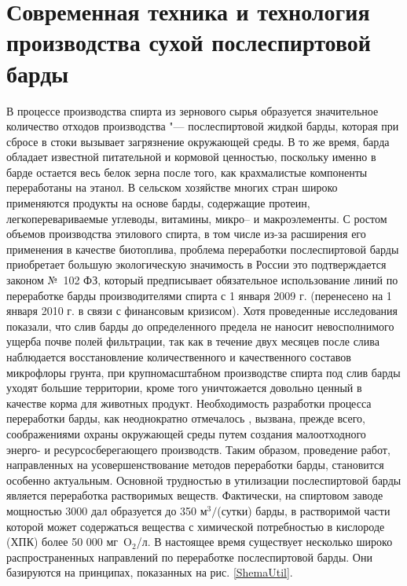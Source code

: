 \clearpage
\section{Современная техника и технология производства сухой послеспиртовой барды}

В процессе производства спирта из зернового сырья образуется значительное количество отходов производства "--- послеспиртовой жидкой барды, которая при сбросе в стоки вызывает загрязнение окружающей среды. 
В то же время, барда обладает известной питательной и кормовой ценностью, поскольку именно в барде остается весь белок зерна после того, как крахмалистые компоненты переработаны на этанол. 
В сельском хозяйстве многих стран широко применяются продукты на основе барды, содержащие протеин, легкоперевариваемые углеводы, витамины, микро-- и макроэлементы. 
С ростом объемов производства этилового спирта, в том числе из-за расширения его применения в качестве биотоплива, проблема переработки послеспиртовой барды приобретает большую экологическую значимость \cite{Androsonov_2010_4} в России это подтверждается законом №~102 ФЗ, который предписывает обязательное использование линий по переработке барды производителями спирта с 1 января 2009 г. (перенесено на 1 января 2010 г. в связи с финансовым кризисом). 
Хотя проведенные исследования \cite{Shunyaeva_2004_15} показали, что слив барды до определенного предела не наносит невосполнимого ущерба почве полей фильтрации, так как в течение двух месяцев после слива наблюдается восстановление количественного и качественного составов микрофлоры грунта, при крупномасштабном производстве спирта под слив барды уходят большие территории, кроме того уничтожается довольно ценный в качестве корма для животных продукт. 
Необходимость разработки процесса переработки барды, как неоднократно отмечалось \cite{Dvoreckiy_1998,Zuzina_1990}, вызвана, прежде всего, соображениями охраны окружающей среды путем создания малоотходного энерго- и ресурсосберегающего производств. 
Таким образом, проведение работ, направленных на усовершенствование методов переработки барды, становится особенно актуальным. 
Основной трудностью в утилизации послеспиртовой барды является переработка растворимых веществ. 
Фактически, на спиртовом заводе мощностью 3000 дал образуется до 350 м$^3/$(сутки) барды, в растворимой части которой может содержаться вещества с химической потребностью в кислороде (ХПК) более 50 000 мг~O$_{2}$/л. 
В настоящее время существует несколько широко распространенных направлений по переработке послеспиртовой барды. 
Они базируются на принципах, показанных на рис. \ref{ShemaUtil}\cite{Novikov_2007_2_Journal}. 

